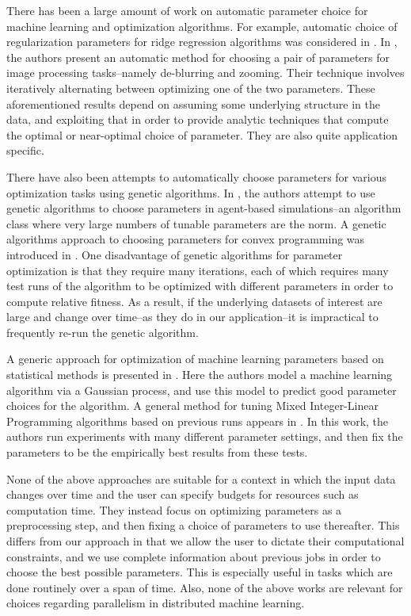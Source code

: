 There has been a large amount of work on automatic parameter choice for machine learning and optimization algorithms.
For example, automatic choice of regularization parameters for ridge regression algorithms was considered in \cite{CI12}.
In \cite{GEE10}, the authors present an automatic method for choosing a pair of parameters for image processing tasks--namely de-blurring and zooming. Their technique involves iteratively alternating between optimizing one of the two parameters.
These aforementioned results depend on assuming some 
underlying structure in the data, and exploiting that in order to provide 
analytic techniques that compute the optimal or near-optimal choice of 
parameter. They are also quite application specific.

There have also been attempts to automatically choose parameters for various optimization tasks using genetic algorithms. In \cite{CH05}, the authors attempt to use genetic algorithms to choose parameters in agent-based simulations--an algorithm class where very large numbers of tunable parameters are the norm. A genetic algorithms approach to choosing parameters for convex programming was introduced in \cite{AST09}. One disadvantage of genetic algorithms for parameter optimization is that they require many iterations, each of which requires many test runs of the algorithm to be optimized with different parameters in order to compute relative fitness. As a result, if the underlying datasets of interest are large and change over time--as they do in our application--it is impractical to frequently re-run the genetic algorithm. 

A generic approach for optimization of machine learning parameters based on statistical methods is presented in \cite{SLA12}. Here the authors model a machine learning algorithm via a Gaussian process, and use this model to predict good parameter choices for the algorithm. A general method for tuning Mixed Integer-Linear Programming algorithms based on previous runs appears in \cite{BBGH07}. In this work, the authors run experiments with many different parameter settings, and then fix the parameters to be the empirically best results from these tests.

None of the above approaches are suitable for a context in which the input data changes over time and the user can specify budgets for resources such as computation time. They instead focus on optimizing parameters as a preprocessing step, and then fixing a choice of parameters to use thereafter. This differs from our approach in that we allow the user to dictate their computational constraints, and we use complete information about previous jobs in order to choose the best possible parameters. This is especially useful in tasks which are done routinely over a span of time. Also, none of the above works are relevant for choices regarding parallelism in distributed machine learning.

